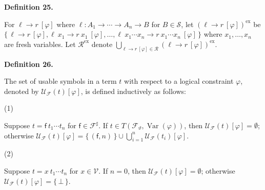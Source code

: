 \documentclass[10pt,a4paper]{amsart}
\begin{document}
 
 
\par\medskip\noindent\textbf{Definition 25.}\par
 
 
For ${\ell}\rightarrow{r}\ [\varphi]$ where $\ell:{A}_{1}\rightarrow\cdots\rightarrow{A}_{n}\rightarrow B$ for $B\in\mathcal{S}$, let $({\ell}\rightarrow{r}\ [\varphi])^{\mathrm{ex}}$ be $\{\,{\ell}\rightarrow{r}\ [\varphi],{{\ell}\ {x_{1}}}\rightarrow{{r}\ {x_{1}}}\ [\varphi],\ldots,{{\ell}\ {{x}_{1}\cdots{x}_{n}}}\rightarrow{{r}\ {{x}_{1}\cdots{x}_{n}}}\ [\varphi]\,\}$ where ${x}_{1},\ldots,{x}_{n}$ are fresh variables. Let $\mathcal{R}^{\mathrm{ex}}$ denote $\bigcup_{{\ell}\rightarrow{r}\ [\varphi]\in\mathcal{R}}({\ell}\rightarrow{r}\ [\varphi])^{\mathrm{ex}}$.\par
 
 
 
 
\par\medskip\noindent\textbf{Definition 26.}\par
 
 
The set of usable symbols in a term $t$ with respect to a logical constraint $\varphi$, denoted by $\mathcal{U}_{\mathcal{F}}(t)[\varphi]$, is defined inductively as follows:\par
  
\par\noindent  (1) 
 
Suppose $t={\mathsf{f}}\ {{t}_{1}\cdots{t}_{n}}$ for $\mathsf{f}\in\mathcal{F}^{\sharp}$. If $t\in T({\mathcal{F}}_{\vartheta},\operatorname{Var}(\varphi))$, then $\mathcal{U}_{\mathcal{F}}(t)[\varphi]=\emptyset$; otherwise $\mathcal{U}_{\mathcal{F}}(t)[\varphi]=\{\,(\mathsf{f},n)\,\}\cup\bigcup_{i=1}^{n}\mathcal{U}_{\mathcal{F}}(t_{i})[\varphi]$.\par
 
 
 
\par\noindent  (2) 
 
Suppose $t={x}\ {{t}_{1}\cdots{t}_{n}}$ for $x\in\mathcal{V}$. If $n=0$, then $\mathcal{U}_{\mathcal{F}}(t)[\varphi]=\emptyset$; otherwise $\mathcal{U}_{\mathcal{F}}(t)[\varphi]=\{\,\bot\,\}$.\par
 
\end{document}
